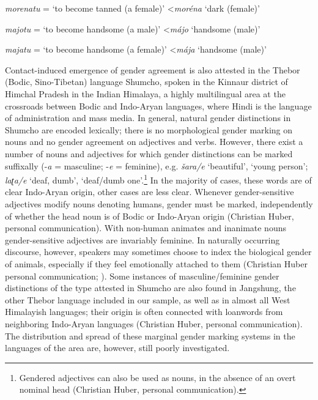 \documentclass[output=collectionpaper]{langsci/langscibook}
\begin{document}
\textit{morenatu} = `to become tanned (a female)' \textless \textit{mor\'ena} `dark (female)'

\textit{majotu} = `to become handsome (a male)' \textless \textit{m\'ajo} `handsome (male)'

\textit{majatu} = `to become handsome (a female)' \textless \textit{m\'aja} `handsome (male)'

\z




Contact-induced emergence of gender agreement is also attested in the Thebor (Bodic, Sino-Tibetan) language Shumcho, spoken in the Kinnaur district of Himchal Pradesh in the Indian Himalaya, a highly multilingual area at the crossroads between Bodic and Indo-Aryan languages, where Hindi is the language of administration and mass media. In general, natural gender distinctions in Shumcho are encoded lexically; there is no morphological gender marking on nouns and no gender agreement on adjectives and verbs. However, there exist a number of nouns and adjectives for which gender distinctions can be marked suffixally (-\textit{a} = masculine; -\textit{e} = feminine), e.g. \textit{šara/e} `beautiful', `young person';  \textit{la{ʈ}a/e} `deaf, dumb', `deaf/dumb one'.\footnote{Gendered adjectives can also be used as nouns, in the absence of an overt nominal head (Christian Huber, personal communication).} In the majority of cases, these words are of clear Indo-Aryan origin, other cases are less clear. Whenever gender-sensitive adjectives modify nouns denoting humans, gender must be marked, independently of whether the head noun is of Bodic or Indo-Aryan origin (Christian Huber, personal communication). With non-human animates and inanimate nouns gender-sensitive adjectives are invariably feminine. In naturally occurring discourse, however, speakers may sometimes choose to index the biological gender of animals, especially if they feel emotionally attached to them (Christian Huber personal communication; \citealt[76]{Huber2011}). Some instances of masculine/feminine gender distinctions of the type attested in Shumcho are also found in Jangshung, the other Thebor language included in our sample, as well as in almost all West Himalayish languages; their origin is often connected with loanwords from neighboring Indo-Aryan languages (Christian Huber, personal communication). The distribution and spread of these marginal gender marking systems in the languages of the area are, however, still poorly investigated.
\end{document}
